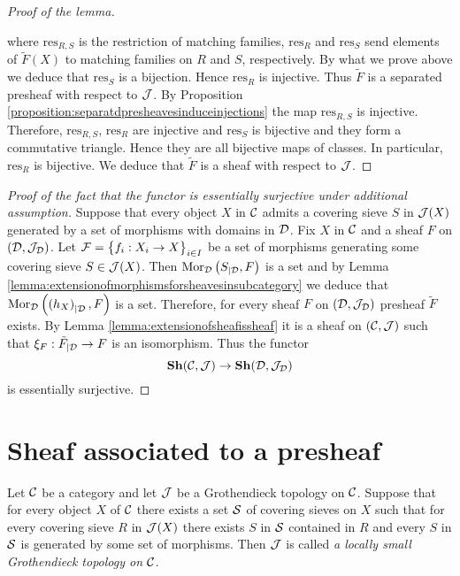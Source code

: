 \begin{proof}[Proof of the lemma]
\begin{center}
\end{center}
where $\mathrm{res}_{R,S}$ is the restriction of matching families, $\mathrm{res}_{R}$ and $\mathrm{res}_{S}$ send elements of $\tilde{F}(X)$ to matching families on $R$ and $S$, respectively. By what we prove above we deduce that $\mathrm{res}_S$ is a bijection. Hence $\mathrm{res}_R$ is injective. Thus $\tilde{F}$ is a separated presheaf with respect to ${\mathcal J}$. By Proposition \ref{proposition:separatdpresheavesinduceinjections} the map $\mathrm{res}_{R,S}$ is injective. Therefore, $\mathrm{res}_{R,S}$, $\mathrm{res}_R$ are injective and $\mathrm{res}_S$ is bijective and they form a commutative triangle. Hence they are all bijective maps of classes. In particular, $\mathrm{res}_R$ is bijective. We deduce that $\tilde{F}$ is a sheaf with respect to ${\mathcal J}$.
\end{proof}

\begin{proof}[Proof of the fact that the functor is essentially surjective under additional assumption]
Suppose that every object $X$ in ${\mathcal C}$ admits a covering sieve $S$ in ${\mathcal J}(X)$ generated by a set of morphisms with domains in ${\mathcal D}$. Fix $X$ in ${\mathcal C}$ and a sheaf $F$ on $\left({\mathcal D},{\mathcal J}_{{\mathcal D}}\right)$. Let ${\mathcal F} = \big\{f_i:X_i\rightarrow X\big\}_{i\in I}$ be a set of morphisms generating some covering sieve $S\in {\mathcal J}(X)$. Then $\mathrm{Mor}_{{\mathcal D}}\left(S_{\mid {\mathcal D}},F\right)$ is a set and by Lemma \ref{lemma:extensionofmorphismsforsheavesinsubcategory} we deduce that $\mathrm{Mor}_{{\mathcal D}}\left(\left(h_X\right)_{\mid {\mathcal D}},F\right)$ is a set. Therefore, for every sheaf $F$ on $\left({\mathcal D},{\mathcal J}_{{\mathcal D}}\right)$ presheaf $\tilde{F}$ exists. By Lemma \ref{lemma:extensionofsheafissheaf} it is a sheaf on $\left({\mathcal C},{\mathcal J}\right)$ such that $\xi_{F}:\tilde{F}_{\mid {\mathcal D}}\rightarrow F$ is an isomorphism. Thus the functor
$$\mathbf{Sh}({\mathcal C},{\mathcal J})\rightarrow \mathbf{Sh}({\mathcal D},{\mathcal J}_{{\mathcal D}})$$
is essentially surjective.
\end{proof}

\section{Sheaf associated to a presheaf}

\begin{definition}
Let ${\mathcal C}$ be a category and let ${\mathcal J}$ be a Grothendieck topology on ${\mathcal C}$. Suppose that for every object $X$ of ${\mathcal C}$ there exists a set ${\mathcal S}$ of covering sieves on $X$ such that for every covering sieve $R$ in ${\mathcal J}(X)$ there exists $S$ in ${\mathcal S}$ contained in $R$ and every $S$ in ${\mathcal S}$ is generated by some set of morphisms. Then ${\mathcal J}$ is called \textit{a locally small Grothendieck topology on ${\mathcal C}$}.
\end{definition}


